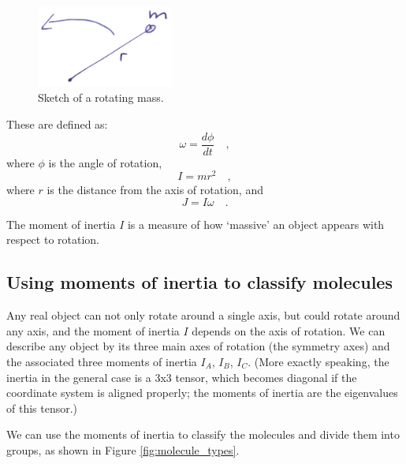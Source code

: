 \begin{figure}
  \centering
  \includegraphics[width=0.4\textwidth]{figures/rotating_mass}
  \caption{Sketch of a rotating mass.}
  \label{fig:rotating_mass}
\end{figure}

These are defined as:
\begin{equation}
  \omega = \frac{d\phi}{dt} \quad ,
\end{equation} 
where $\phi$ is the angle of rotation,
\begin{equation}
  \label{eq:def_I}
  I = m r^2 \quad ,
\end{equation}
where $r$ is the distance from the axis of rotation, and
\begin{equation}
  \label{eq:6}
  J = I \omega \quad .
\end{equation}

The moment of inertia $I$ is a measure of how `massive' an object
appears with respect to rotation.

\subsection{Using moments of inertia to classify molecules}

Any real object can not only rotate around a single axis, but could
rotate around any axis, and the moment of inertia $I$ depends on the
axis of rotation. We can describe any object by its three main axes of
rotation (the symmetry axes) and the associated three moments of
inertia $I_A$, $I_B$, $I_C$. (More exactly speaking, the inertia in
the general case is a 3x3 tensor, which becomes diagonal if the
coordinate system is aligned properly; the moments of inertia are the
eigenvalues of this tensor.)

We can use the moments of inertia to classify the molecules and divide
them into groups, as shown in Figure \ref{fig:molecule_types}.

